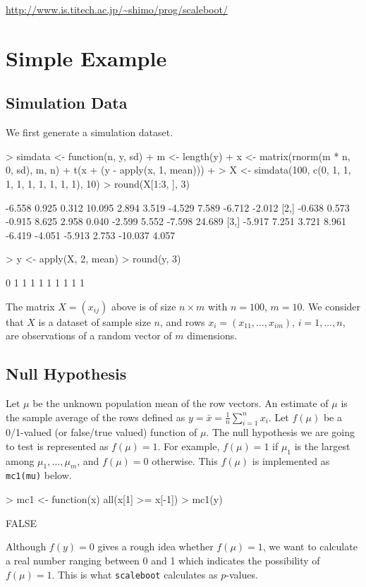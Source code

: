 \documentclass[a4paper]{amsart}
\begin{document}
\url{http://www.is.titech.ac.jp/~shimo/prog/scaleboot/}


\section{Simple Example}

\subsection{Simulation Data}

We first generate a simulation dataset.
\begin{Schunk}
\begin{Sinput}
> simdata <- function(n, y, sd) {
+     m <- length(y)
+     x <- matrix(rnorm(m * n, 0, sd), m, n)
+     t(x + (y - apply(x, 1, mean)))
+ }
> X <- simdata(100, c(0, 1, 1, 1, 1, 1, 1, 1, 1, 1), 10)
> round(X[1:3, ], 3)
\end{Sinput}
\begin{Soutput}
       [,1]  [,2]   [,3]   [,4]   [,5]   [,6]   [,7]  [,8]    [,9]  [,10]
[1,] -6.558 0.925  0.312 10.095  2.894  3.519 -4.529 7.589  -6.712 -2.012
[2,] -0.638 0.573 -0.915  8.625  2.958  0.040 -2.599 5.552  -7.598 24.689
[3,] -5.917 7.251  3.721  8.961 -6.419 -4.051 -5.913 2.753 -10.037  4.057
\end{Soutput}
\begin{Sinput}
> y <- apply(X, 2, mean)
> round(y, 3)
\end{Sinput}
\begin{Soutput}
 [1] 0 1 1 1 1 1 1 1 1 1
\end{Soutput}
\end{Schunk}
The matrix $X=(x_{ij})$ above is of size $n\times m$ with $n=100$,
$m=10$. We consider that $X$ is a dataset of sample size $n$, and rows
$x_i = (x_{11},\ldots,x_{im})$, $i=1,\ldots,n$, are observations of a
random vector of $m$ dimensions. 

\subsection{Null Hypothesis}

Let $\mu$ be the unknown population mean of the row vectors. An
estimate of $\mu$ is the sample average of the rows defined as $y =
\bar x = \tfrac{1}{n}\sum_{i=1}^n x_i $. Let $f(\mu)$ be a 0/1-valued
(or false/true valued) function of $\mu$. The null hypothesis we are
going to test is represented as $f(\mu)=1$. For example, $f(\mu)=1$ if
$\mu_1$ is the largest among $\mu_1,\ldots,\mu_m$, and $f(\mu)=0$
otherwise. This $f(\mu)$ is implemented as {\tt mc1(mu)} below.
\begin{Schunk}
\begin{Sinput}
> mc1 <- function(x) all(x[1] >= x[-1])
> mc1(y)
\end{Sinput}
\begin{Soutput}
[1] FALSE
\end{Soutput}
\end{Schunk}
Although $f(y)=0$ gives a rough idea whether $f(\mu)=1$, we want to
calculate a real number ranging between 0 and 1 which indicates the
possibility of $f(\mu)=1$.
This is what {\tt scaleboot} calculates as $p$-values. 
\end{document}
